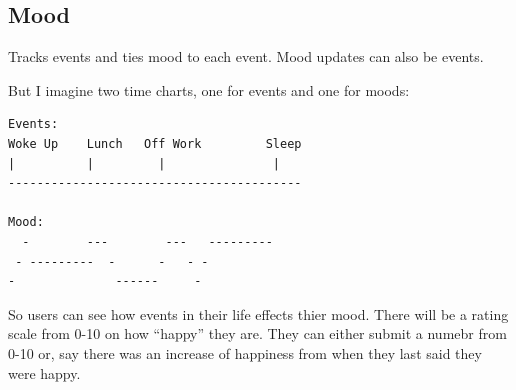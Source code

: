 \documentclass[12pt]{article}
\begin{document}
\subsection{Mood}

Tracks events and ties mood to each event. Mood updates can also be events.

But I imagine two time charts, one for events and one for moods:

\begin{verbatim}
Events:
Woke Up    Lunch   Off Work         Sleep
|          |         |               |
-----------------------------------------

Mood:
  -        ---        ---   ---------
 - ---------  -      -   - -
-              ------     -

\end{verbatim}

So users can see how events in their life effects thier mood. There will be a rating scale from 0-10 on how ``happy'' they are. They can either submit a numebr from 0-10 or, say there was an increase of happiness from when they last said they were happy.
\end{document}
